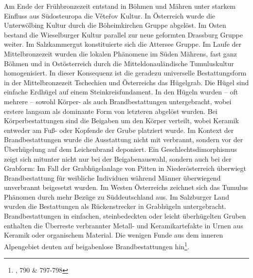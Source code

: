 \documentclass[openany,twoside,twocolumn]{book}
\let\rmarkdownfootnote\footnote%
\def\footnote{\protect\rmarkdownfootnote}
\begin{document}
Am Ende der Frühbronzezeit entstand in Böhmen und Mähren unter starkem
Einfluss aus Südosteuropa die Věteřov Kultur. In Österreich wurde die
Unterwölbing Kultur durch die Böheimkirchen Gruppe abgelöst. Im Osten
bestand die Wieselburger Kultur parallel zur neue geformten Drassburg
Gruppe weiter. Im Salzkammergut konstituierte sich die Attersee Gruppe.
Im Laufe der Mittelbronzezeit wurden die lokalen Phänomene im Süden
Mährens, fast ganz Böhmen und in Ostösterreich durch die
Mitteldonauländische Tumuluskultur homogenisiert. In dieser Konsequenz
ist die geradezu universelle Bestattungsform in der Mittelbronzezeit
Tschechien und Österreichs das Hügelgrab. Die Hügel sind einfache
Erdhügel auf einem Steinkreisfundament. In den Hügeln wurden -- oft
mehrere -- sowohl Körper- als auch Brandbestattungen untergebracht,
wobei erstere langsam als dominante Form von letzteren abgelöst wurden.
Bei Körperbestattungen sind die Beigaben um den Körper verteilt, wobei
Keramik entweder am Fuß- oder Kopfende der Grube platziert wurde. Im
Kontext der Brandbestattungen wurde die Ausstattung nicht mit verbrannt,
sondern vor der Überhügelung auf dem Leichenbrand deponiert. Ein
Geschlechtsdimorphismus zeigt sich mitunter nicht nur bei der
Beigabenauswahl, sondern auch bei der Grabform: Im Fall der
Grabhügelanlage von Pitten in Niederösterreich überwiegt Brandbestattung
für weibliche Individuen während Männer überwiegend unverbrannt
beigesetzt wurden. Im Westen Österreichs zeichnet sich das Tumulus
Phänomen durch mehr Bezüge zu Süddeutschland aus. Im Salzburger Land
wurden die Bestattungen als Rückenstrecker in Grabhügeln untergebracht.
Brandbestattungen in einfachen, steinbedeckten oder leicht überhügelten
Gruben enthalten die Überreste verbrannter Metall- und Keramikartefakte
in Urnen aus Keramik oder organischem Material. Die wenigen Funde aus
dem inneren Alpengebiet deuten auf beigabenlose Brandbestattungen
hin\footnote{\textcite{lubos_czech_2013}, 790 \& 797-798}.
\end{document}
